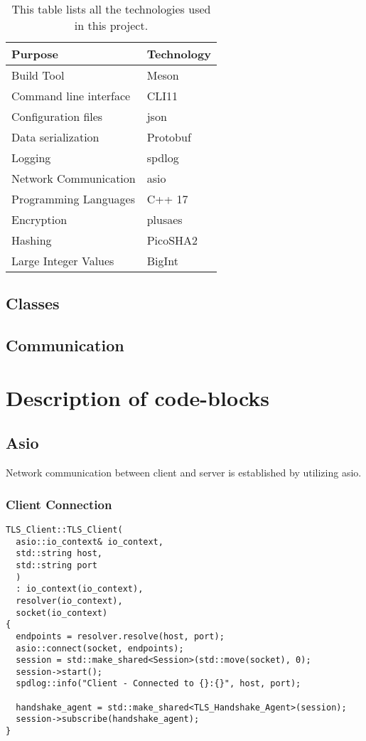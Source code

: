 \documentclass[12pt, letterpaper]{article}
\newenvironment{code}{\captionsetup{type=listing}}{}
\begin{document}
\begin{table}[h]
	\centering
	\begin{tabular}{l|l}
		Purpose                       & Technology \\ \hline
		Build Tool				 	  & Meson	   \\
		Command line interface	      & CLI11      \\
		Configuration files           & json       \\
		Data serialization            & Protobuf   \\
		Logging                       & spdlog     \\
		Network Communication         & asio       \\
		Programming Languages		  & C++ 17 \\
		Encryption 					& plusaes \\
		Hashing 					& PicoSHA2 \\
		Large Integer Values & BigInt \\
	\end{tabular}
	\caption{This table lists all the technologies used in this project.}
\end{table}

\subsection{Classes}

\subsection{Communication}


\section{Description of code-blocks}


\subsection{Asio}
Network communication between client and server is established by utilizing asio.

\subsubsection{Client Connection}

\begin{code}
	\begin{verbatim}
TLS_Client::TLS_Client(
  asio::io_context& io_context, 
  std::string host, 
  std::string port
  )
  : io_context(io_context),
  resolver(io_context),
  socket(io_context) 
{	
  endpoints = resolver.resolve(host, port);
  asio::connect(socket, endpoints);
  session = std::make_shared<Session>(std::move(socket), 0);
  session->start();
  spdlog::info("Client - Connected to {}:{}", host, port);
	
  handshake_agent = std::make_shared<TLS_Handshake_Agent>(session);
  session->subscribe(handshake_agent);
}
	\end{verbatim}
	\caption{Creation of socket connection on client side.}
	\label{clientConnection}
\end{code}
\end{document}
